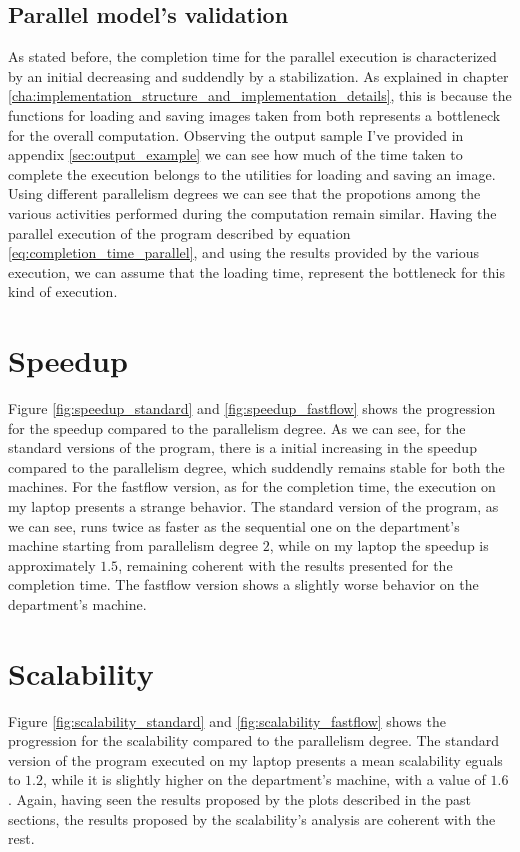         \subsection{Parallel model's validation} %
        \label{sub:parallel_model_s_validation}
            As stated before, the completion time for the parallel execution is characterized by an initial
            decreasing and suddendly by a stabilization. As explained in chapter
            \ref{cha:implementation_structure_and_implementation_details}, this is because the functions for
            loading and saving images taken from \cite{cimg} both represents a bottleneck for
            the overall computation. Observing the output sample I've provided in appendix
            \ref{sec:output_example} we can see how much of the time taken to complete the execution belongs to
            the utilities for loading and saving an image. Using different parallelism degrees we can see that
            the propotions among the various activities performed during the computation remain similar.
            Having the parallel execution of the program described by equation
            \ref{eq:completion_time_parallel}, and using the results provided by the various execution, we
            can assume that the loading time, represent the bottleneck for this kind of
            execution.
    \section{Speedup} %
    \label{sec:speedup}
        Figure \ref{fig:speedup_standard} and \ref{fig:speedup_fastflow} shows the progression for the speedup
        compared to the parallelism degree. As we can see, for the standard versions of the program, there is a
        initial increasing in the speedup compared to the parallelism degree, which suddendly remains stable
        for both the machines. For the fastflow version, as for the completion time, the execution on my laptop
        presents a strange behavior. The standard version of the program, as we can see, runs twice as faster
        as the sequential one on the department's machine starting from parallelism degree $2$, while on my
        laptop the speedup is approximately $1.5$, remaining coherent with the results presented for the
        completion time. The fastflow version shows a slightly worse behavior on the department's machine.
    \section{Scalability} %
    \label{sec:scalability}
        Figure \ref{fig:scalability_standard} and \ref{fig:scalability_fastflow} shows the progression for the
        scalability compared to the parallelism degree. The standard version of the program executed on my
        laptop presents a mean scalability eguals to $1.2$, while it is slightly higher on the department's
        machine, with a value of $1.6$. Again, having seen the results proposed by the plots described in the
        past sections, the results proposed by the scalability's analysis are coherent with the rest.

